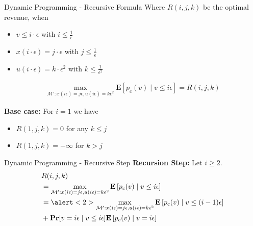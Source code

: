 \documentclass{beamer}
\begin{document}
\begin{frame}{Dynamic Programming - Recursive Formula}
  Where $R(i,j,k)$ be the optimal revenue, when
  \begin{itemize}
    \item $v \leq i \cdot \epsilon$ with $i \leq \frac{1}{\epsilon}$
    \item $x(i \cdot \epsilon) = j \cdot \epsilon$ with $j \leq \frac{1}{\epsilon}$
    \item $u(i \cdot \epsilon) = k \cdot \epsilon^2$ with $k \leq \frac{1}{\epsilon^2}$
  \end{itemize}
  \begin{align*}
    \max_{\mathcal{M}' : x(i\epsilon) = j\epsilon, u(i\epsilon) = k\epsilon^2} \mathbf{E}[p_c(v) \mid v \leq i \epsilon] = R(i,j,k)
  \end{align*}

  \textbf{Base case:}
  For $i = 1$ we have
  \begin{itemize}
    \item $R(1,j,k) = 0$ for any $k \leq j$
    \item $R(1,j,k) = -\infty$ for $k > j$
  \end{itemize}
\end{frame}

\begin{frame}{Dynamic Programming - Recursive Step}
  \textbf{Recursion Step:}
  Let $i \geq 2$.
  \begin{align*}
     & R(i,j,k)                                                                                                                                           \\
     & = \max_{\mathcal{M}' : x(i\epsilon) = j\epsilon, u(i\epsilon) = k\epsilon^2} \mathbf{E}\left[p_c(v) \mid v \leq i \epsilon\right]                  \\
     & = \alert<2>{\max_{\mathcal{M}' : x(i\epsilon) = j\epsilon, u(i\epsilon) = k\epsilon^2} \mathbf{E}\left[p_c(v) \mid v \leq (i - 1) \epsilon\right]} \\
     & + \mathbf{Pr}[v = i\epsilon \mid v \leq i \epsilon] \mathbf{E}\left[p_c(v) \mid v = i\epsilon\right]
  \end{align*}
\end{frame}
\end{document}
